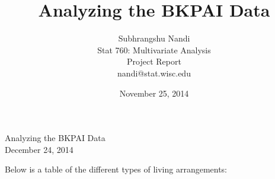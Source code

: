 \documentclass[11pt]{article}
\begin{document}



\title{Analyzing the BKPAI Data}
\author{Subhrangshu Nandi\\
  Stat 760: Multivariate Analysis\\
  Project Report \\
  nandi@stat.wisc.edu}
\date{November 25, 2014}


\begin{center}
{\Large{Analyzing the BKPAI Data}}\\
December 24, 2014
\end{center}
Below is a table of the different types of living arrangements:\\
\end{document}
